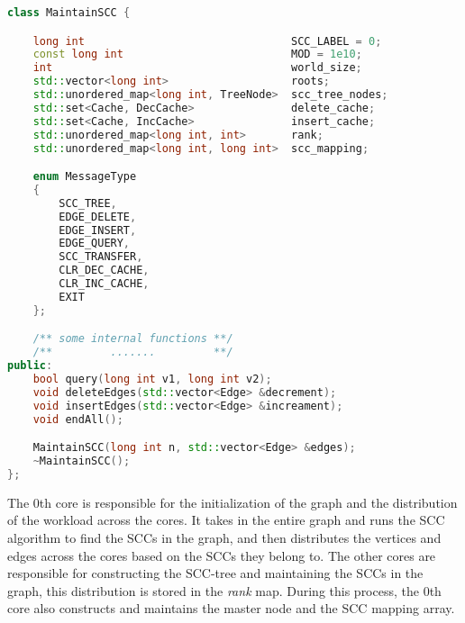 \begin{lstlisting}[language=C++, label={lst:workload_distribution}]
class MaintainSCC {

    long int                                SCC_LABEL = 0;
    const long int                          MOD = 1e10;
    int                                     world_size;
    std::vector<long int>                   roots;
    std::unordered_map<long int, TreeNode>  scc_tree_nodes;
    std::set<Cache, DecCache>               delete_cache;
    std::set<Cache, IncCache>               insert_cache;
    std::unordered_map<long int, int>       rank;
    std::unordered_map<long int, long int>  scc_mapping;

    enum MessageType
    {
        SCC_TREE,
        EDGE_DELETE,
        EDGE_INSERT,
        EDGE_QUERY,
        SCC_TRANSFER,
        CLR_DEC_CACHE,
        CLR_INC_CACHE,
        EXIT
    };

    /** some internal functions **/
    /**         .......         **/
public:
    bool query(long int v1, long int v2);
    void deleteEdges(std::vector<Edge> &decrement);
    void insertEdges(std::vector<Edge> &increament);
    void endAll();

    MaintainSCC(long int n, std::vector<Edge> &edges);
    ~MaintainSCC();
};
\end{lstlisting}

The 0th core is responsible for the initialization of the graph and the distribution of the workload across the cores.
It takes in the entire graph and runs the SCC algorithm to find the SCCs in the graph, and then distributes the vertices and edges across the cores based on the SCCs they belong to.
The other cores are responsible for constructing the SCC-tree and maintaining the SCCs in the graph, this distribution is stored in the \textit{rank} map. During this process, the 0th core also constructs and maintains the master node and the SCC mapping array.

